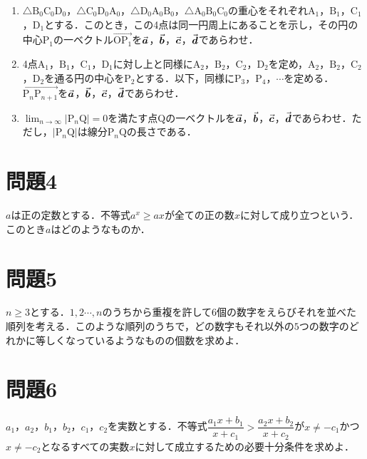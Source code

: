 \documentclass[unicode,12pt, A4j]{ltjsarticle}%
\begin{document}
\begin{enumerate}
 \item $\triangle \mathrm{B_0C_0D_0}$，$\triangle \mathrm{C_0D_0A_0}$，$\triangle \mathrm{D_0A_0B_0}$，$\triangle \mathrm{A_0B_0C_0}$の重心をそれぞれ$\mathrm{A}_1$，$\mathrm{B}_1$，$\mathrm{C}_1$，$\mathrm{D}_1$とする．このとき，この4点は同一円周上にあることを示し，その円の中心$\mathrm{P}_1$の一ベクトル$\overrightarrow{\mathrm{OP_1}}$を$\va*{a}$，$\va*{b}$，$\va*{c}$，$\va*{d}$であらわせ．
 \item 4点$\mathrm{A}_1$，$\mathrm{B}_1$，$\mathrm{C}_1$，$\mathrm{D}_1$に対し上と同様に$\mathrm{A}_2$，$\mathrm{B}_2$，$\mathrm{C}_2$，$\mathrm{D}_2$を定め，$\mathrm{A}_2$，$\mathrm{B}_2$，$\mathrm{C}_2$，$\mathrm{D}_2$を通る円の中心を$\mathrm{P}_2$とする．以下，同様に$\mathrm{P}_3$，$\mathrm{P}_4$，$\cdots$を定める．$\overrightarrow{\mathrm{P}_n\mathrm{P}_{n+1}}$を$\va*{a}$，$\va*{b}$，$\va*{c}$，$\va*{d}$であらわせ．
 \item ${\displaystyle \lim_{n\to\infty} |\mathrm{P}_n\mathrm{Q}|=0}$を満たす点$\mathrm{Q}$の一ベクトルを$\va*{a}$，$\va*{b}$，$\va*{c}$，$\va*{d}$であらわせ．ただし，$|\mathrm{P}_n\mathrm{Q}|$は線分$\mathrm{P}_n\mathrm{Q}$の長さである．
\end{enumerate}


\section{問題4}
$a$は正の定数とする．不等式$a^x\ge ax$が全ての正の数$x$に対して成り立つという．このとき$a$はどのようなものか．

\section{問題5}
$n\ge 3$とする．$1,2 \cdots,n$のうちから重複を許して$6$個の数字をえらびそれを並べた順列を考える．このような順列のうちで，どの数字もそれ以外の$5$つの数字のどれかに等しくなっているようなものの個数を求めよ．


\section{問題6}
$a_1$，$a_2$，$b_1$，$b_2$，$c_1$，$c_2$を実数とする．不等式$\dfrac{a_1x+b_1}{x+c_1} > \dfrac{a_2x+b_2}{x+c_2}$が$x\neq -c_1$かつ$x\neq -c_2$となるすべての実数$x$に対して成立するための必要十分条件を求めよ．
\end{document}
